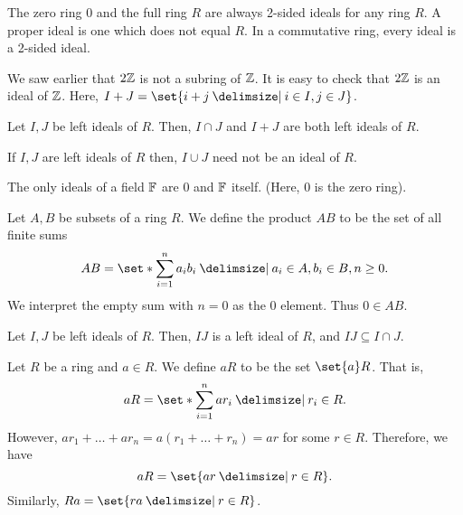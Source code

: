 \documentclass[11pt]{penrose}
\begin{document}
\begin{remark}
    The zero ring $0$ and the full ring $R$ are always 2-sided ideals for any ring $R$. A proper ideal is one which does not equal $R$. In a commutative ring, every ideal is a 2-sided ideal.
\end{remark}

\begin{negg}
    We saw earlier that $2\mathbb{Z}$ is not a subring of $\mathbb{Z}$. It is easy to check that $2\mathbb{Z}$ is an ideal of $\mathbb{Z}$. Here, $I + J = \set{i+j \st i \in I, j \in J}$.
\end{negg}

\begin{nlemma}
    Let $I, J$ be left ideals of $R$. Then, $I \cap J$ and $I + J$ are both left ideals of $R$.
\end{nlemma}

\begin{remark}
    If $I, J$ are left ideals of $R$ then, $I \cup J$ need not be an ideal of $R$.
\end{remark}

\begin{nlemma}
    The only ideals of a field $\mathbb{F}$ are $0$ and $\mathbb{F}$ itself. (Here, $0$ is the zero ring).
\end{nlemma}

\begin{ndfn}
    Let $A, B$ be subsets of a ring $R$. We define the product $AB$ to be the set of all finite sums
    \begin{equation*}
        AB = \set*{ \sum_{i=1}^{n} a_i b_i \st a_i \in A, b_i \in B, n \geq 0 }.
    \end{equation*}
    We interpret the empty sum with $n = 0$ as the $0$ element. Thus $0 \in AB$.
\end{ndfn}

\begin{nlemma}
    Let $I, J$ be left ideals of $R$. Then, $IJ$ is a left ideal of $R$, and $IJ \subseteq I \cap J$.
\end{nlemma}

\begin{negg}
    Let $R$ be a ring and $a \in R$. We define $aR$ to be the set $\set{a}R$. That is,
    \begin{equation*}
        aR = \set*{\sum_{i=1}^{n} a r_i \st r_i \in R}.
    \end{equation*}
    However, $ar_1 + \dots + ar_n = a (r_1 + \dots + r_n) = ar$ for some $r \in R$. Therefore, we have
    \begin{equation*}
        aR = \set{ar \st r \in R}.
    \end{equation*}
    Similarly, $Ra = \set{ra \st r \in R}$.
\end{negg}
\end{document}
